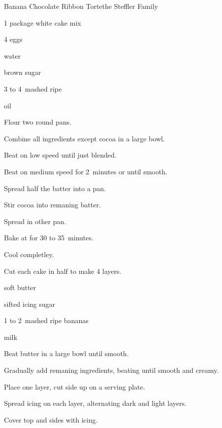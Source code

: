 \begin{recipe}{Banana Chocolate Ribbon Torte}{the Steffler Family}{}

\begin{ingredients}
\item 1 package white cake mix
\item 4 eggs
\item \C{\half} water
\item \C{\quarter} 
\item {} brown sugar
\item 3 to 4~mashed ripe 
\item \C{\third} oil
\end{ingredients}

\begin{directions}
\item Flour two round pans.
\item Combine all ingredients except cocoa in a large bowl.
\item Beat on low speed until just blended.
\item Beat on medium speed for 2~minutes or until smooth.
\item Spread half the batter into a pan.
\item Stir cocoa into remaning batter.
\item Spread in other pan.
\item Bake at  for 30 to 35~minutes.
\item Cool completley.
\item Cut each cake in half to make 4 layers.
\end{directions}


\begin{ingredients}
\item \C{\half} soft butter
\item {} sifted icing sugar
\item 1 to 2~mashed ripe bananas
\item {} milk
\end{ingredients}

\begin{directions}
\item Beat butter in a large bowl until smooth.
\item Gradually add remaning ingredients, beating until smooth and creamy.
\item Place one layer, cut side up on a serving plate.
\item Spread icing on each layer, alternating dark and light layers.
\item Cover top and sides with icing.
\end{directions}
\end{recipe}
